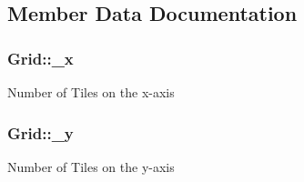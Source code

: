 \subsection{Member Data Documentation}
\subsubsection[{\-\_\-x}]{ Grid\-::\-\_\-x\hspace{0.3cm}{\ttfamily [private]}}\label{class_grid_a0de783a906bc60749538bbfcb5e21eec}
Number of Tiles on the x-\/axis 
\subsubsection[{\-\_\-y}]{ Grid\-::\-\_\-y\hspace{0.3cm}{\ttfamily [private]}}\label{class_grid_ab3eb4febe35bece4a81df8bc99140583}
Number of Tiles on the y-\/axis 